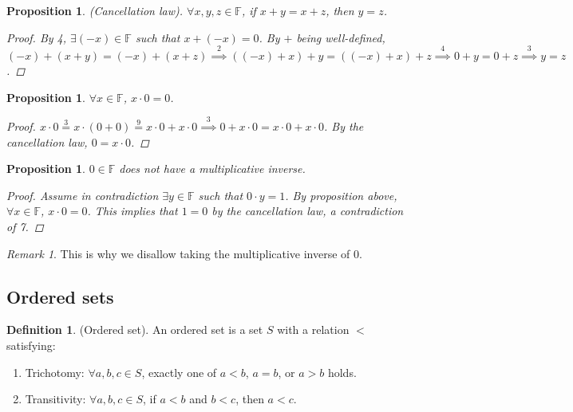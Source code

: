 \documentclass[10pt]{article}
\newcommand{\F}{\mathbb{F}}
\newtheorem{proposition}[theorem]{Proposition}
\theoremstyle{definition}
\newtheorem{definition}[theorem]{Definition}
\theoremstyle{remark}
\newtheorem*{remark}{Remark}
\begin{document}
\begin{proposition}
    (Cancellation law).
    $\forall x, y, z \in \F$, if $x + y = x + z$, then $y = z$.
    \begin{proof}
        By 4, $\exists (-x) \in \F$ such that $x + (-x) = 0$.
        By $+$ being well-defined, $(-x) + (x + y) = (-x) + (x + z) \overset{2}{\implies}
        ((-x) + x) + y = ((-x) + x) + z \overset{4}{\implies}
        0 + y = 0 + z \overset{3}{\implies}
        y = z$.
    \end{proof}
\end{proposition}

\begin{proposition}
    $\forall x \in \F$, $x \cdot 0 = 0$.
    \begin{proof}
        $x \cdot 0 \overset{3}{=} x \cdot (0 + 0) \overset{9}{=} x \cdot 0 + x \cdot 0
        \overset{3}{\implies} 0 + x \cdot 0 = x \cdot 0 + x \cdot 0$.
        By the cancellation law, $0 = x \cdot 0$.
    \end{proof}
\end{proposition}

\begin{proposition}
    $0 \in \F$ does not have a multiplicative inverse.
    \begin{proof}
        Assume in contradiction $\exists y \in \F$ such that $0 \cdot y = 1$.
        By proposition above, $\forall x \in \F$, $x \cdot 0 = 0$.
        This implies that $1 = 0$ by the cancellation law, a contradiction of 7.
    \end{proof}
\end{proposition}

\begin{remark}
    This is why we disallow taking the multiplicative inverse of 0.
\end{remark}

\subsection{Ordered sets}

\begin{definition}
    (Ordered set).
    An ordered set is a set $S$ with a relation $<$ satisfying:
    \begin{enumerate}
        \item Trichotomy: $\forall a, b, c \in S$, exactly one of $a < b$, $a = b$, or $a > b$ holds.
        \item Transitivity: $\forall a, b, c \in S$, if $a < b$ and $b < c$, then $a < c$.
    \end{enumerate}
\end{definition}
\end{document}
